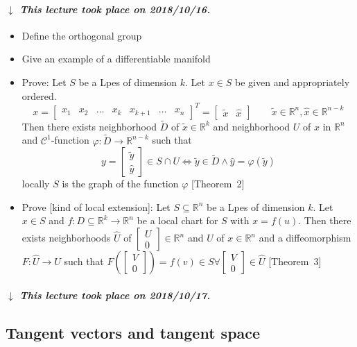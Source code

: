\documentclass{article}
\numberwithin{lecref}{section}
\newcommand{\dateref}[1]{%
  \begin{mdframed}[backgroundcolor=gray!10,innerbottommargin=0pt,innertopmargin=0pt]
    \paragraph{\textit{$\downarrow$ This lecture took place on #1.}}%
  \end{mdframed}%
}
\begin{document}
\dateref{2018/10/16}

\begin{itemize}
  \item Define the orthogonal group
  \item Give an example of a differentiable manifold
  \item Prove: Let $S$ be a Lpes of dimension $k$. Let $x \in S$ be given and appropriately ordered.
    \[ x = \begin{bmatrix} x_1 & x_2 & \dots & x_k & x_{k+1} & \dots & x_{n} \end{bmatrix}^T = \begin{bmatrix} \tilde x & \hat x \end{bmatrix} \qquad \tilde x \in \mathbb R^n, \hat x \in \mathbb R^{n - k} \]
    Then there exists neighborhood $\tilde D$ of $\tilde x \in \mathbb R^k$ and neighborhood $U$ of $x$ in $\mathbb R^n$ and $\mathcal C^1$-function $\varphi: \tilde D \to \mathbb R^{n - k}$ such that
    \[ y = \begin{bmatrix} \tilde y \\ \hat y \end{bmatrix} \in S \cap U \iff \tilde y \in \tilde D \land \hat y = \varphi(\tilde y) \]
    locally $S$ is the graph of the function $\varphi$ [Theorem~2]
  \item Prove [kind of local extension]: Let $S \subseteq \mathbb R^n$ be a Lpes of dimension $k$. Let $x \in S$ and $f: D \subseteq \mathbb R^k \to \mathbb R^n$ be a local chart for $S$ with $x = f(u)$. Then there exists neighborhoods $\hat U$ of $\begin{bmatrix} U \\ 0 \end{bmatrix} \in \mathbb R^n$ and $U$ of $x \in \mathbb R^n$ and a diffeomorphism $F: \hat U \to U$ such that $F\left(\begin{bmatrix} V \\ 0 \end{bmatrix}\right) = f(v) \in S \forall \begin{bmatrix} V \\ 0 \end{bmatrix} \in \hat{U}$ [Theorem~3]
\end{itemize}

\dateref{2018/10/17}

\subsection*{Tangent vectors and tangent space}
\end{document}
